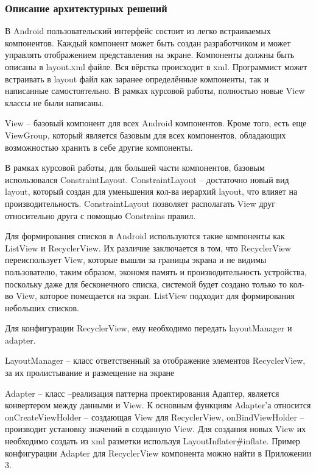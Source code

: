 \subsubsection{Описание архитектурных решений}\indent
{}

В Android пользовательский интерфейс состоит из легко встраиваемых компонентов.
Каждый компонент может быть создан разработчиком и может управлять отображением представления на экране.
Компоненты должны быть описаны в layout.xml файле.
Вся вёрстка происходит в xml.
Программист может встраивать в layout файл как заранее определённые компоненты, так и написанные самостоятельно.
В рамках курсовой работы, полностью новые View классы не были написаны.

View – базовый компонент для всех Android компонентов.
Кроме того, есть еще ViewGroup, который является базовым для всех компонентов, обладающих возможностью хранить в себе другие компоненты.

В рамках курсовой работы, для большей части компонентов, базовым использовался ConstraintLayout.
ConstraintLayout – достаточно новый вид layout, который создан для уменьшения кол-ва иерархий layout, что влияет на производительность.
ConstraintLayout позволяет располагать View друг относительно друга с помощью Constrains правил.

Для формирования списков в Android используются такие компоненты как ListView и RecyclerView.
Их различие заключается в том, что RecyclerView переиспользует View, которые вышли за границы экрана и не видимы пользователю, таким образом, экономя память и производительность устройства, поскольку даже для бесконечного списка, системой будет создано только то кол-во View, которое помещается на экран.
ListView подходит для формирования небольших списков.

Для конфигурации RecyclerView, ему необходимо передать layoutManager и adapter.

LayoutManager – класс ответственный за отображение элементов RecyclerView, за их пролистывание и размещение на экране

Adapter – класс –реализация паттерна проектирования Адаптер, является конвертером между данными и View.
К основным функциям Adapter’а относится onCreateViewHolder – создающая View для RecyclerView, onBindViewHolder – производит установку значений в созданную View.
Для создания новых View их необходимо создать из xml разметки используя LayoutInflater\#inflate.
Пример конфигурации Adapter для RecyclerView компонента можно найти в Приложении 3.

